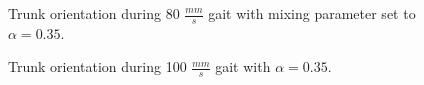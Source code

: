 			\begin{figure}
				\centering
				\caption{Trunk orientation during 80 $\frac{mm}{s}$ gait with mixing  parameter set to $\alpha = 0.35$.}
				\label{fig::narx80_a35}
			\end{figure}
			\begin{figure}
				\centering
				\caption{Trunk orientation during 100 $\frac{mm}{s}$ gait with $\alpha = 0.35$.} 
				\label{fig::narx100_a35}
			\end{figure}